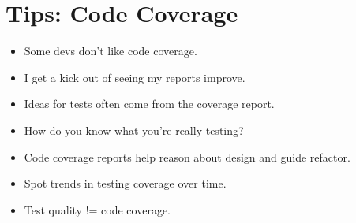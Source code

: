 \documentclass{article}
\begin{document}
\sloppy
\section{Tips: Code Coverage}
\begin{itemize}
    \item Some devs don't like code coverage.
    \item I get a kick out of seeing my reports improve.
    \item Ideas for tests often come from the coverage report.
    \item How do you know what you're really testing?
    \item Code coverage reports help reason about design and guide refactor.
    \item Spot trends in testing coverage over time.
    \item Test quality != code coverage.
\end{itemize}
\end{document}
